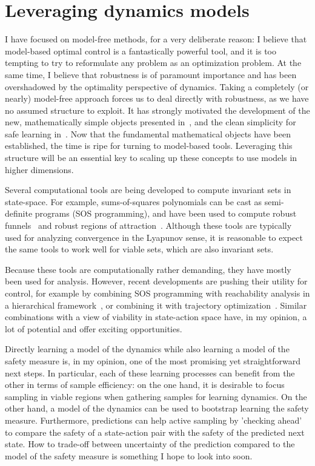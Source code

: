 \section{Leveraging dynamics models}
I have focused on model-free methods, for a very deliberate reason: I believe that model-based optimal control is a fantastically powerful tool, and it is too tempting to try to reformulate any problem as an optimization problem.
At the same time, I believe that robustness is of paramount importance and has been overshadowed by the optimality perspective of dynamics.
Taking a completely (or nearly) model-free approach forces us to deal directly with robustness, as we have no assumed structure to exploit.
It has strongly motivated the development of the new, mathematically simple objects presented in~\cite{heim2019beyond}, and the clean simplicity for safe learning in~\cite{heim2019learnable}.
Now that the fundamental mathematical objects have been established, the time is ripe for turning to model-based tools. Leveraging this structure will be an essential key to scaling up these concepts to use models in higher dimensions. \par
Several computational tools are being developed to compute invariant sets in state-space. For example, sums-of-squares polynomials can be cast as semi-definite programs (SOS programming), and have been used to compute robust funnels~\cite{majumdar2013robust} and robust regions of attraction~\cite{valmorbida2014roa_invariants}. Although these tools are typically used for analyzing convergence in the Lyapunov sense, it is reasonable to expect the same tools to work well for viable sets, which are also invariant sets. \par
Because these tools are computationally rather demanding, they have mostly been used for analysis. However, recent developments are pushing their utility for control, for example by combining SOS programming with reachability analysis in a hierarchical framework~\cite{singh2018robust}, or combining it with trajectory optimization~\cite{manchester2019robust}. Similar combinations with a view of viability in state-action space have, in my opinion, a lot of potential and offer exciting opportunities. \par
Directly learning a model of the dynamics while also learning a model of the safety measure is, in my opinion, one of the most promising yet straightforward next steps. In particular, each of these learning processes can benefit from the other in terms of sample efficiency: on the one hand, it is desirable to focus sampling in viable regions when gathering samples for learning dynamics. On the other hand, a model of the dynamics can be used to bootstrap learning the safety measure. Furthermore, predictions can help active sampling by 'checking ahead' to compare the safety of a state-action pair with the safety of the predicted next state. How to trade-off between uncertainty of the prediction compared to the model of the safety measure is something I hope to look into soon.